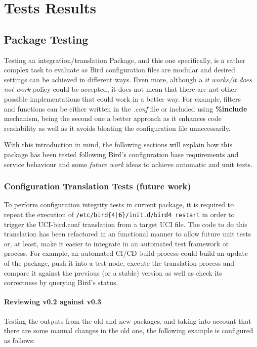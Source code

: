 \chapter{Tests Results}
\label{ch:tresults}

\section{Package Testing}
Testing an integration/translation Package, and this one specifically, is a rather complex task to evaluate as Bird configuration files are modular and desired settings can be achieved in different ways. Even more, although a \textit{it works/it does not work} policy could be accepted, it does not mean that there are not other possible implementations that could work in a better way. For example, filters and functions can be either written in the \textit{.conf} file or included using \textbf{\%include} mechanism, being the second one a better approach as it enhances code readability as well as it avoids bloating the configuration file unnecessarily.

With this introduction in mind, the following sections will explain how this package has been tested following Bird's configuration base requirements and service behaviour and some \textit{future work} ideas to achieve automatic and unit tests.


\subsection{Configuration Translation Tests (future work)}
To perform configuration integrity tests in current package, it is required to repeat the execution of \texttt{/etc/bird\{4|6\}/init.d/bird4 restart} in order to trigger the UCI-bird.conf translation from a target UCI file. The code to do this translation has been refactored in an functional manner to allow future unit tests or, at least, make it easier to integrate in an automated test framework or process. For example, an automated CI/CD build process could build an update of the package, push it into a test node, execute the translation process and compare it against the previous (or a stable) version as well as check its correctness by querying Bird's status.

\subsubsection{Reviewing v0.2 against v0.3}
Testing the outputs from the old and new packages, and taking into account that there are some manual changes in the old one, the following example is configured as follows:

